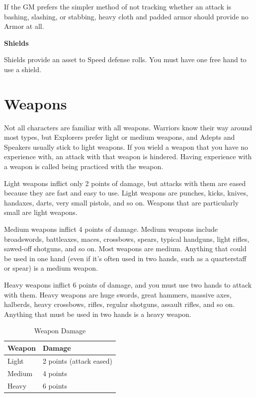 \begin{multicols}{2}

If the GM prefers the simpler method of not tracking whether an attack is bashing, slashing, or stabbing, heavy cloth and padded armor should provide no Armor at all.

\textbf{Shields}

Shields provide an asset to Speed defense rolls. You must have one free hand to use a shield.

\section{Weapons}

Not all characters are familiar with all weapons. Warriors know their way around most types, but Explorers prefer light or medium weapons, and Adepts and Speakers usually stick to light weapons. If you wield a weapon that you have no experience with, an attack with that weapon is hindered. Having experience with a weapon is called being practiced with the weapon.

Light weapons inflict only 2 points of damage, but attacks with them are eased because they are fast and easy to use. Light weapons are punches, kicks, knives, handaxes, darts, very small pistols, and so on. Weapons that are particularly small are light weapons.

Medium weapons inflict 4 points of damage. Medium weapons include broadswords, battleaxes, maces, crossbows, spears, typical handguns, light rifles, sawed-off shotguns, and so on. Most weapons are medium. Anything that could be used in one hand (even if it’s often used in two hands, such as a quarterstaff or spear) is a medium weapon.

Heavy weapons inflict 6 points of damage, and you must use two hands to attack with them. Heavy weapons are huge swords, great hammers, massive axes, halberds, heavy crossbows, rifles, regular shotguns, assault rifles, and so on. Anything that must be used in two hands is a heavy weapon.

\end{multicols}

\begin{table}[h]
\centering

\caption{Weapon Damage}
\label{tab:Weapon Damage}

\begin{tabularx}{0.5\textwidth} { | Y | Y | }
\hline
\textbf{Weapon} & \textbf{Damage} \\ \hline
Light & 2 points (attack eased)\\ \hline
Medium & 4 points \\ \hline
Heavy & 6 points \\ \hline

\end{tabularx}
\end{table}

